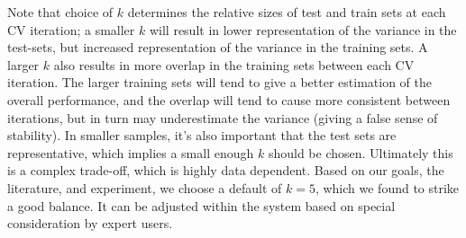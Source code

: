 Note that choice of $k$ determines the relative sizes of test and train sets at each CV iteration; a smaller $k$ will result in lower representation of the variance in the test-sets, but increased representation of the variance in the training sets. A larger $k$ also results in more overlap in the training sets between each CV iteration. The larger training sets will tend to give a better estimation of the overall performance, and the overlap will tend to cause more consistent between iterations, but in turn may underestimate the variance (giving a false sense of stability). In smaller samples, it's also important that the test sets are representative, which implies a small enough $k$ should be chosen. Ultimately this is a complex trade-off, which is highly data dependent. Based on our goals, the literature, and experiment, we choose a default of $k=5$, which we found to strike a good balance. It can be adjusted within the system based on special consideration by expert users.





